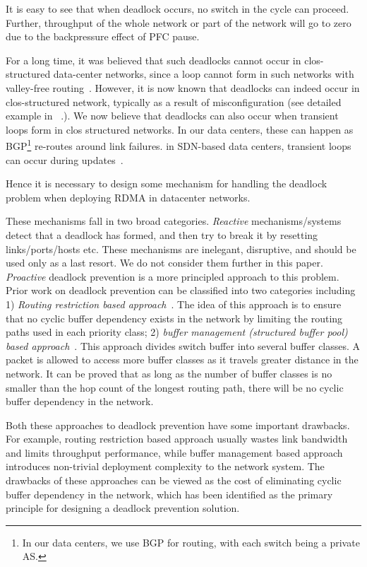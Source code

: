 It is easy to see that when deadlock occurs, no switch in the cycle can proceed.
Further, throughput of the whole network or part of the network will go to zero
due to the backpressure effect of PFC pause. 

For a long time, it was believed that such deadlocks cannot occur in
clos-structured data-center networks, since a loop cannot form in such networks
with valley-free routing~\cite{dcqcn}.  However, it is now known that deadlocks
can indeed occur in clos-structured network, typically as a result of
misconfiguration (see detailed example in ~\cite{rdmascale}.). We now believe
that deadlocks can also occur when transient loops form in clos structured
networks. In our data centers, these can happen as BGP\footnote{In our data
centers, we use BGP for routing, with each switch being a private AS.} re-routes
around link failures. in SDN-based data centers, transient loops can occur
during updates~\cite{dionysus}.

Hence it is necessary to design some mechanism for handling the deadlock
problem when deploying RDMA in datacenter networks. 

These mechanisms fall in two broad categories. {\em Reactive} mechanisms/systems
detect that a deadlock has formed, and then try to break it by resetting
links/ports/hosts etc.  These mechanisms are inelegant, disruptive, and should
be used only as a last resort.  We do not consider them further in this paper.
{\em Proactive} deadlock prevention is a more principled approach to this
problem.  Prior work on deadlock prevention can be classified into two
categories including 1) \textit{Routing restriction based
approach}~\cite{tcpbolt,flich2012survey}. The idea of this approach is to ensure
that no cyclic buffer dependency exists in the network by limiting the routing
paths used in each priority class;  2) \textit{buffer management (structured
buffer pool) based approach}~\cite{gerla1980flow,karol2003prevention}. This
approach divides switch buffer into several buffer classes. A packet is allowed
to access more buffer classes as it travels greater distance in the network. It
can be proved that as long as the number of buffer classes is no smaller than
the hop count of the longest routing path, there will be no cyclic buffer
dependency in the network.

Both these approaches to deadlock prevention have some important drawbacks. For
example, routing restriction based approach usually wastes link bandwidth and
limits throughput performance, while buffer management based approach introduces
non-trivial deployment complexity to the network system. The drawbacks of these
approaches can be viewed as the cost of eliminating cyclic buffer dependency in
the network, which has been identified as the primary principle for designing a
deadlock prevention solution.


